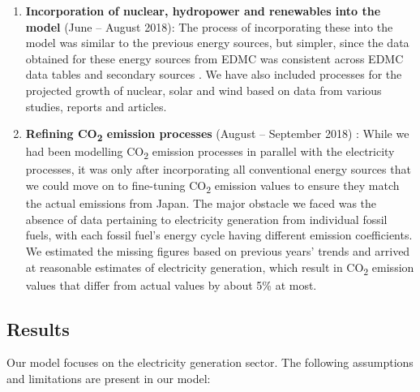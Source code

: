 \documentclass[14pt,a4paper]{article} %
\begin{document}
\begin{enumerate}
\item \textbf{Incorporation of nuclear, hydropower and renewables into the model} (June – August 2018): The process of incorporating these into the model was similar to the previous energy sources, but simpler, since the data obtained for these energy sources from EDMC was consistent across EDMC data tables and secondary sources \cite{noauthor_energy_2018} \cite{noauthor_iea_2017} \cite{noauthor_japan_2017}. We have also included processes for the projected growth of nuclear, solar and wind based on data from various studies, reports and articles. \cite{publicover_japan_2017} \cite{dincer_analysis_2011} \cite{noauthor_geothermal_2018} \cite{heger_wind_2016} \cite{noauthor_operational_2013} \cite{noauthor_electricity_2017}

\item \textbf{Refining CO\textsubscript{2} emission processes} (August – September 2018) : While we had been modelling CO\textsubscript{2} emission processes in parallel with the electricity processes, it was only after incorporating all conventional energy sources that we could move on to fine-tuning CO\textsubscript{2} emission values to ensure they match the actual emissions from Japan. The major obstacle we faced was the absence of data pertaining to electricity generation from individual fossil fuels, with each fossil fuel's energy cycle having different emission coefficients. We estimated the missing figures based on previous years' trends \cite{noauthor_energy_2018} \cite{noauthor_national_2018} and arrived at reasonable estimates of electricity generation, which result in CO\textsubscript{2} emission values that differ from actual values by about 5\% at most.

\end{enumerate}

\subsection{Results}

	Our model focuses on the electricity generation sector. The following assumptions and limitations are present in our model:
	
\end{document}
